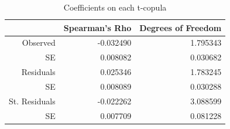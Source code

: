 \documentclass[11pt,letterpaper]{memoir}
\begin{document}
\begin{table}[ht]
\centering
\caption{Coefficients on each t-copula}
\begin{tabular}{rrr}
  \hline
 & Spearman's Rho & Degrees of Freedom \\ 
  \hline
Observed & -0.032490 & 1.795343 \\ 
  SE & 0.008082 & 0.030682\\ 
  Residuals & 0.025346 & 1.783245 \\ 
  SE & 0.008089 & 0.030288\\ 
  St. Residuals & -0.022262 & 3.088599 \\ 
  SE & 0.007709 & 0.081228 \\ 
   \hline
\end{tabular}
\end{table}
\end{document}
